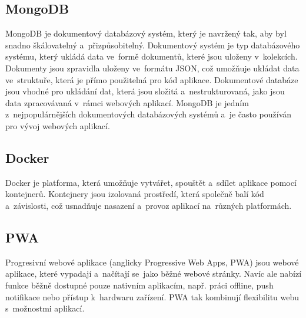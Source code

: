 \subsection{MongoDB}\label{mongo} MongoDB je dokumentový databázový systém, který je navržený tak, aby byl snadno škálovatelný a~přizpůsobitelný. Dokumentový systém je typ databázového systému, který ukládá data ve~formě dokumentů, které jsou uloženy v~kolekcích. Dokumenty jsou zpravidla uloženy ve~formátu JSON, což umožňuje ukládat data ve~struktuře, která je přímo použitelná pro kód aplikace. Dokumentové databáze jsou vhodné pro ukládání dat, která jsou složitá a~nestrukturovaná, jako jsou data zpracovávaná v~rámci webových aplikací. MongoDB je jedním z~nejpopulárnějších dokumentových databázových systémů a~je často používán pro vývoj webových aplikací.

\subsection{Docker} Docker je platforma, která umožňuje vytvářet, spouštět a~sdílet aplikace pomocí kontejnerů. Kontejnery jsou izolovaná prostředí, která společně balí kód a~závislosti, což usnadňuje nasazení a~provoz aplikací na~různých platformách. \cite{docker}
\newpage
\subsection{PWA}\label{pwa} Progresivní webové aplikace (anglicky Progressive Web Apps, PWA) jsou webové aplikace, které vypadají a~načítají se~jako běžné webové stránky. Navíc ale nabízí funkce běžně dostupné pouze nativním aplikacím, např. práci offline, push notifikace nebo přístup k~hardwaru zařízení. PWA tak kombinují flexibilitu webu s~možnostmi aplikací. \cite{pwa}